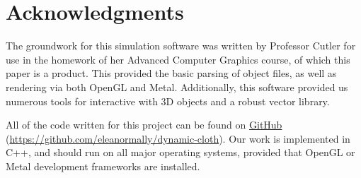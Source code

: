 \documentclass[sigconf]{acmart}
\begin{document}
\section{Acknowledgments}
The groundwork for this simulation software was written by Professor Cutler for use in the homework of her Advanced Computer Graphics course, of which this paper is a product. This provided the basic parsing of object files, as well as rendering via both OpenGL and Metal. Additionally, this software provided us numerous tools for interactive with 3D objects and a robust vector library.

All of the code written for this project can be found on \href{https://github.com/eleanormally/dynamic-cloth}{GitHub} (\url{https://github.com/eleanormally/dynamic-cloth}). Our work is implemented in C++, and should run on all major operating systems, provided that OpenGL or Metal development frameworks are installed.


\end{document}
